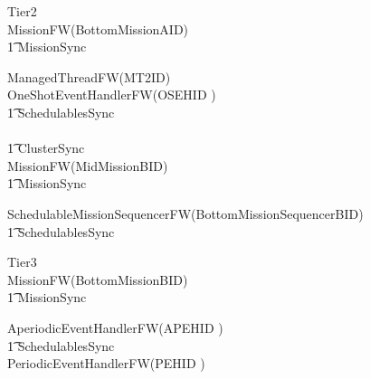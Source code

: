 \begin{circus}
\circprocess Tier2 \circdef \\

\circblockopen
	MissionFW(BottomMissionAID)\\
		\t1 	\lpar MissionSync \rpar \\
		\circblockopen



			ManagedThreadFW(MT2ID)\\









	OneShotEventHandlerFW(OSEHID   )\\




\t1 \lpar SchedulablesSync \rpar\\




		\circblockclose
\circblockclose
	\\ \t1 \lpar ClusterSync \rpar \\

\circblockopen
	MissionFW(MidMissionBID)\\
		\t1 	\lpar MissionSync \rpar \\
		\circblockopen









			SchedulableMissionSequencerFW(BottomMissionSequencerBID)\\
\t1 \lpar SchedulablesSync \rpar\\



		\circblockclose
\circblockclose
\end{circus}
%
\begin{circus}
\circprocess Tier3 \circdef \\

\circblockopen
	MissionFW(BottomMissionBID)\\
		\t1 	\lpar MissionSync \rpar \\
		\circblockopen










			AperiodicEventHandlerFW(APEHID )\\

\t1 \lpar SchedulablesSync \rpar\\



			PeriodicEventHandlerFW(PEHID )\\
		\circblockclose
\circblockclose
\end{circus}
